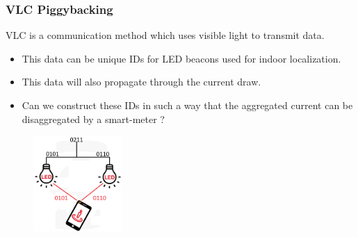 \documentclass{beamer}
\begin{document}
	\begin{frame}\frametitle{VLC Piggybacking}

		VLC is a communication method which uses visible light to transmit data.

		\begin{itemize}

			\item This data can be unique IDs for LED beacons used for indoor localization.

			\item This data will also propagate through the current draw.

			\item Can we construct these IDs in such a way that the aggregated current can be disaggregated by a smart-meter ?

		\end{itemize}


		\begin{figure}
			\centering
			\includegraphics[width=0.3\textwidth]{vlc-indoor-positioning-edit.png}
		\end{figure}



	\end{frame}
\end{document}
